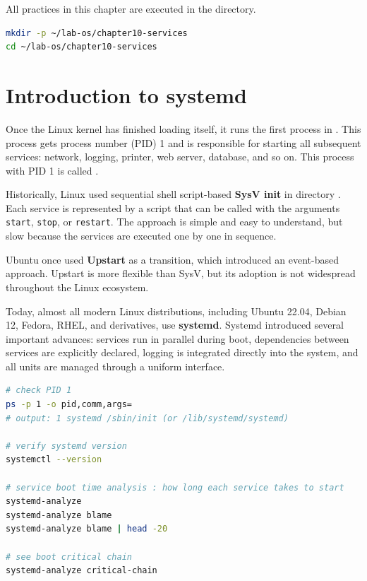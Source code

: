 \begin{notebox}
All practices in this chapter are executed in the  directory.
\begin{lstlisting}[language=bash]
mkdir -p ~/lab-os/chapter10-services
cd ~/lab-os/chapter10-services
\end{lstlisting}
\end{notebox}

\section{Introduction to systemd}
\label{sec:init-system}

Once the Linux kernel has finished loading itself, it runs the first process in . This process gets process number (PID) 1 and is responsible for starting all subsequent services: network, logging, printer, web server, database, and so on. This process with PID 1 is called .

Historically, Linux used sequential shell script-based \textbf{SysV init} in directory . Each service is represented by a script that can be called with the arguments \texttt{start}, \texttt{stop}, or \texttt{restart}. The approach is simple and easy to understand, but slow because the services are executed one by one in sequence.

Ubuntu once used \textbf{Upstart} as a transition, which introduced an event-based approach. Upstart is more flexible than SysV, but its adoption is not widespread throughout the Linux ecosystem.

Today, almost all modern Linux distributions, including Ubuntu 22.04, Debian 12, Fedora, RHEL, and derivatives, use \textbf{systemd}. Systemd introduced several important advances: services run in parallel during boot, dependencies between services are explicitly declared, logging is integrated directly into the system, and all units are managed through a uniform interface.

\begin{lstlisting}[language=bash, caption={Verify init system and analyze boot time}]
# check PID 1
ps -p 1 -o pid,comm,args=
# output: 1 systemd /sbin/init (or /lib/systemd/systemd)

# verify systemd version
systemctl --version

# service boot time analysis : how long each service takes to start
systemd-analyze
systemd-analyze blame
systemd-analyze blame | head -20

# see boot critical chain
systemd-analyze critical-chain
\end{lstlisting}

